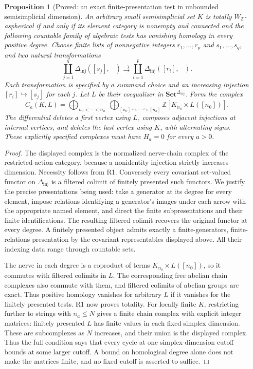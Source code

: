 \documentclass[11pt,a4paper]{article}
\newtheorem{proposition}[theorem]{Proposition}
\theoremstyle{definition}
\theoremstyle{remark}
\newcommand{\Set}{\mathbf{Set}}
\newcommand{\Z}{\mathbb Z}
\newcommand{\WZ}{W_{\mathbb Z}}
\begin{document}


\begin{proposition}[Proved: an exact finite-presentation test in unbounded semisimplicial dimension]\label{A:semisimplicial-tests}
An arbitrary small semisimplicial set $K$ is totally $\WZ$-aspherical if and only if its element category is nonempty and connected and the following countable family of algebraic tests has vanishing homology in every positive degree. Choose finite lists of nonnegative integers $r_1,\ldots,r_p$ and $s_1,\ldots,s_q$, and two natural transformations
\[
 \coprod_{j=1}^{q}\Delta_{\mathrm{inj}}([s_j],-)
 \rightrightarrows
 \coprod_{i=1}^{p}\Delta_{\mathrm{inj}}([r_i],-).
\]
Each transformation is specified by a summand choice and an increasing injection $[r_i]\hookrightarrow[s_j]$ for each $j$. Let $L$ be their coequalizer in $\Set^{\Delta_{\mathrm{inj}}}$. Form the complex
\[
 C_a(K,L)=
 \bigoplus_{n_0<\cdots<n_a}
 \ \bigoplus_{[n_0]\hookrightarrow\cdots\hookrightarrow[n_a]}
 \Z[K_{n_a}\times L([n_0])].
\]
The differential deletes a first vertex using $L$, composes adjacent injections at internal vertices, and deletes the last vertex using $K$, with alternating signs. These explicitly specified complexes must have $H_a=0$ for every $a>0$.
\end{proposition}
\begin{proof}
The displayed complex is the normalized nerve-chain complex of the restricted-action category, because a nonidentity injection strictly increases dimension. Necessity follows from R1. Conversely every covariant set-valued functor on $\Delta_{\mathrm{inj}}$ is a filtered colimit of finitely presented such functors. We justify the precise presentations being used: take a generator at its degree for every element, impose relations identifying a generator's images under each arrow with the appropriate named element, and direct the finite subpresentations and their finite identifications. The resulting filtered colimit recovers the original functor at every degree. A finitely presented object admits exactly a finite-generators, finite-relations presentation by the covariant representables displayed above. All their indexing data range through countable sets.

The nerve in each degree is a coproduct of terms $K_{n_a}\times L([n_0])$, so it commutes with filtered colimits in $L$. The corresponding free abelian chain complexes also commute with them, and filtered colimits of abelian groups are exact. Thus positive homology vanishes for arbitrary $L$ if it vanishes for the finitely presented tests. R1 now proves totality. For locally finite $K$, restricting further to strings with $n_a\leq N$ gives a finite chain complex with explicit integer matrices: finitely presented $L$ has finite values in each fixed simplex dimension. These are subcomplexes as $N$ increases, and their union is the displayed complex. Thus the full condition says that every cycle at one simplex-dimension cutoff bounds at some larger cutoff. A bound on homological degree alone does not make the matrices finite, and no fixed cutoff is asserted to suffice.
\end{proof}
\end{document}
